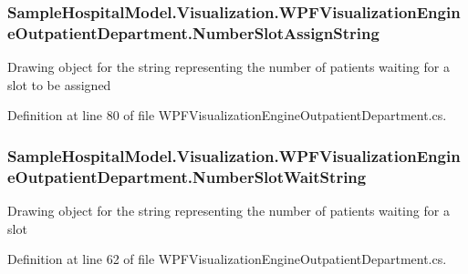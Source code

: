 \subsubsection[{\texorpdfstring{Number\+Slot\+Assign\+String}{NumberSlotAssignString}}]{ Sample\+Hospital\+Model.\+Visualization.\+W\+P\+F\+Visualization\+Engine\+Outpatient\+Department.\+Number\+Slot\+Assign\+String\hspace{0.3cm}{\ttfamily [get]}}\hypertarget{class_sample_hospital_model_1_1_visualization_1_1_w_p_f_visualization_engine_outpatient_department_af57ab2efb02c541b204a377740f69906}{}\label{class_sample_hospital_model_1_1_visualization_1_1_w_p_f_visualization_engine_outpatient_department_af57ab2efb02c541b204a377740f69906}


Drawing object for the string representing the number of patients waiting for a slot to be assigned 



Definition at line 80 of file W\+P\+F\+Visualization\+Engine\+Outpatient\+Department.\+cs.

\subsubsection[{\texorpdfstring{Number\+Slot\+Wait\+String}{NumberSlotWaitString}}]{ Sample\+Hospital\+Model.\+Visualization.\+W\+P\+F\+Visualization\+Engine\+Outpatient\+Department.\+Number\+Slot\+Wait\+String\hspace{0.3cm}{\ttfamily [get]}}\hypertarget{class_sample_hospital_model_1_1_visualization_1_1_w_p_f_visualization_engine_outpatient_department_a992d490ed94e38c9a9cf1b1f2ddff207}{}\label{class_sample_hospital_model_1_1_visualization_1_1_w_p_f_visualization_engine_outpatient_department_a992d490ed94e38c9a9cf1b1f2ddff207}


Drawing object for the string representing the number of patients waiting for a slot 



Definition at line 62 of file W\+P\+F\+Visualization\+Engine\+Outpatient\+Department.\+cs.

